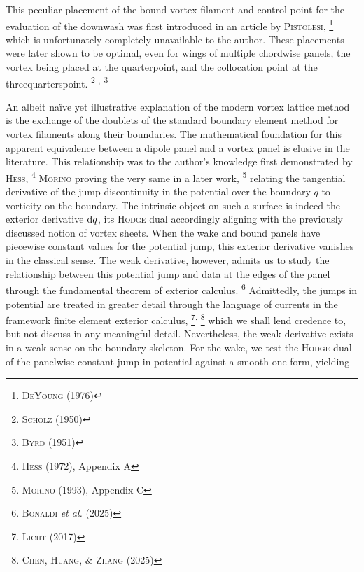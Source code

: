 This peculiar placement of the bound vortex filament and control point for the evaluation of the downwash was first introduced in an article by \textsc{Pistolesi},%
\footnote{%
        \cite{deyoung1976historical} \textsc{DeYoung} (1976)
}
which is unfortunately completely unavailable to the author.
These placements were later shown to be optimal, even for wings of multiple chordwise panels, the vortex being placed at the quarterpoint, and the collocation point at the threequarterspoint.%
\footnote{%
        \cite{scholz1950beitrage} \textsc{Scholz} (1950)
}%
\textsuperscript{,}%
\footnote{%
        \cite{byrd1951erganzung} \textsc{Byrd} (1951)
}


An albeit naïve yet illustrative explanation of the modern vortex lattice method is the exchange of the doublets of the standard boundary element method for vortex filaments along their boundaries.
The mathematical foundation for this apparent equivalence between a dipole panel and a vortex panel is elusive in the literature.
This relationship was to the author's knowledge first demonstrated by \textsc{Hess},%
\footnote{%
        \cite{hess1972calculation} \textsc{Hess} (1972), Appendix A
}
\textsc{Morino} proving the very same in a later work,%
\footnote{%
        \cite{morino1993boundary} \textsc{Morino} (1993), Appendix C
}
relating the tangential derivative of the jump discontinuity in the potential over the boundary $q$ to vorticity on the boundary.
The intrinsic object on such a surface is indeed the exterior derivative $\mathrm{d} q$, its \textsc{Hodge} dual accordingly aligning with the previously discussed notion of vortex sheets.
When the wake and bound panels have piecewise constant values for the potential jump, this exterior derivative vanishes in the classical sense.
The weak derivative, however, admits us to study the relationship between this potential jump and data at the edges of the panel through the fundamental theorem of exterior calculus.%
\footnote{%
  \cite{bonaldi2025exterior} \textsc{Bonaldi} \emph{et al.} (2025)
}
Admittedly, the jumps in potential are treated in greater detail through the language of currents in the framework finite element exterior calculus,%
\footnote{%
  \cite{licht2017complexes} \textsc{Licht} (2017)
}\textsuperscript{,}%
\footnote{%
  \cite{chen2025distributional} \textsc{Chen}, \textsc{Huang}, \& \textsc{Zhang} (2025)
}
which we shall lend credence to, but not discuss in any meaningful detail.
Nevertheless, the weak derivative exists in a weak sense on the boundary skeleton.
For the wake, we test the \textsc{Hodge} dual of the panelwise constant jump in potential against a smooth one-form, yielding

